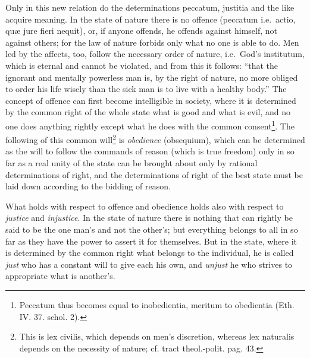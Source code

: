 \documentclass[12pt,a4paper,openany]{book}
\newcommand{\opage}[1]{\marginnote{\footnotesize\textit{[#1]}}}
\begin{document}
\opage{138}\setcounter{footnote}{0}Only in this new relation do the determinations peccatum, justitia and the like acquire meaning. In the state of nature there is no offence (peccatum i.e.\ actio, quæ jure fieri nequit), or, if anyone offends, he offends against himself, not against others; for the law of nature forbids only what no one is able to do. Men led by the affects, too, follow the necessary order of nature, i.e.\ God's institutum, which is eternal and cannot be violated, and from this it follows: ``that the ignorant and mentally powerless man is, by the right of nature, no more obliged to order his life wisely than the sick man is to live with a healthy body.'' The concept of offence can first become intelligible in society, where it is determined by the common right of the whole state what is good and what is evil, and no one does anything rightly except what he does with the common consent\footnote{Peccatum thus becomes equal to inobedientia, meritum to obedientia (Eth. IV. 37. schol. 2).}. The following of this common will\footnote{This is lex civilis, which depends on men's discretion, whereas lex naturalis depends on the necessity of nature; cf. tract theol.-polit. pag. 43.} is \emph{obedience} (obsequium), which can be determined as the will to follow the commands of reason (which is true freedom) only in so far as a real unity of the state can be brought about only by rational determinations of right, and the determinations of right of the best state must be laid down according to the bidding of reason.

What holds with respect to offence and obedience holds also with respect to \emph{justice} and \emph{injustice}. In the state of nature there is nothing that can rightly be said to be the one man's and not the other's; but everything belongs to all in so far as they have the power to assert it for themselves. But in the state, where it is determined by the common right what belongs to the individual, he is called \emph{just} who has a constant will to give each his own, and \emph{unjust} he who strives to appropriate what is another's.
\end{document}
